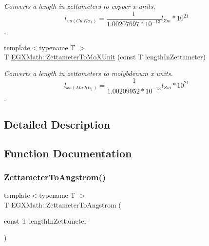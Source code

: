 \begin{DoxyCompactItemize}
\begin{DoxyCompactList}\small\item\em Converts a length in zettameters to copper x units. \[ l_{xu(Cu\ K\alpha_1)}= \frac{1}{1.00207697*10^{-13}} l_{Zm} * 10^{21}\]. \end{DoxyCompactList}\item 
{\footnotesize template$<$typename T $>$ }\\T \mbox{\hyperlink{group___e_g_x_math-_conversions-_length_conversions-_s_i-_zettameter-_non-_s_i_ga10039261b7de3417e69110a56312b9ef}{E\+G\+X\+Math\+::\+Zettameter\+To\+Mo\+X\+Unit}} (const T length\+In\+Zettameter)
\begin{DoxyCompactList}\small\item\em Converts a length in zettameters to molybdenum x units. \[ l_{xu(Mo\ K\alpha_1)}=\frac{1}{1.00209952*10^{-13}} l_{Zm} * 10^{21}\]. \end{DoxyCompactList}\end{DoxyCompactItemize}


\subsection{Detailed Description}


\subsection{Function Documentation}
\mbox{\label{group___e_g_x_math-_conversions-_length_conversions-_s_i-_zettameter-_non-_s_i_ga49d813ff9592fc1fc9a184436d0849fc}} 
\subsubsection{\texorpdfstring{Zettameter\+To\+Angstrom()}{ZettameterToAngstrom()}}
{\footnotesize\ttfamily template$<$typename T $>$ \\
T E\+G\+X\+Math\+::\+Zettameter\+To\+Angstrom (\begin{DoxyParamCaption}\item[{const T}]{length\+In\+Zettameter }\end{DoxyParamCaption})}



